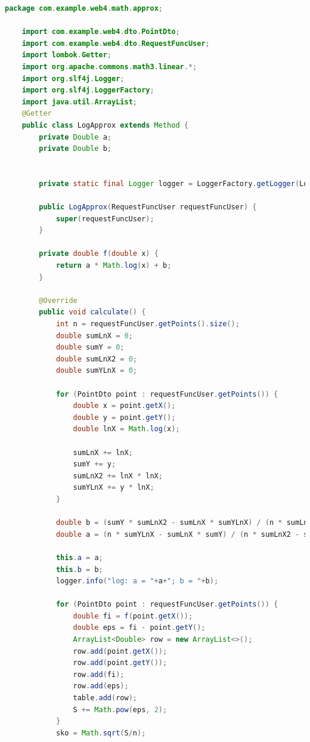 \documentclass{article}
\begin{document}
\begin{lstlisting}[language=Java, caption={Логарифмическая аппроксимация}]
    package com.example.web4.math.approx;

    import com.example.web4.dto.PointDto;
    import com.example.web4.dto.RequestFuncUser;
    import lombok.Getter;
    import org.apache.commons.math3.linear.*;
    import org.slf4j.Logger;
    import org.slf4j.LoggerFactory;
    import java.util.ArrayList;
    @Getter
    public class LogApprox extends Method {
        private Double a;
        private Double b;
    
    
        private static final Logger logger = LoggerFactory.getLogger(LogApprox.class);
    
        public LogApprox(RequestFuncUser requestFuncUser) {
            super(requestFuncUser);
        }
    
        private double f(double x) {
            return a * Math.log(x) + b;
        }
    
        @Override
        public void calculate() {
            int n = requestFuncUser.getPoints().size();
            double sumLnX = 0;
            double sumY = 0;
            double sumLnX2 = 0;
            double sumYLnX = 0;
    
            for (PointDto point : requestFuncUser.getPoints()) {
                double x = point.getX();
                double y = point.getY();
                double lnX = Math.log(x);
    
                sumLnX += lnX;
                sumY += y;
                sumLnX2 += lnX * lnX;
                sumYLnX += y * lnX;
            }
    
            double b = (sumY * sumLnX2 - sumLnX * sumYLnX) / (n * sumLnX2 - sumLnX * sumLnX);
            double a = (n * sumYLnX - sumLnX * sumY) / (n * sumLnX2 - sumLnX * sumLnX);
    
            this.a = a;
            this.b = b;
            logger.info("log: a = "+a+"; b = "+b);
    
            for (PointDto point : requestFuncUser.getPoints()) {
                double fi = f(point.getX());
                double eps = fi - point.getY();
                ArrayList<Double> row = new ArrayList<>();
                row.add(point.getX());
                row.add(point.getY());
                row.add(fi);
                row.add(eps);
                table.add(row);
                S += Math.pow(eps, 2);
            }
            sko = Math.sqrt(S/n);
    

\end{lstlisting}
\end{document}
